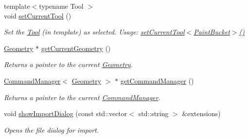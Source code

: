 \begin{DoxyCompactItemize}
{\footnotesize template$<$typename Tool $>$ }\\void \mbox{\hyperlink{classpepr3d_1_1_main_application_a429927346ea0766c39f0b713888f80fd}{set\+Current\+Tool}} ()
\begin{DoxyCompactList}\small\item\em Set the \mbox{\hyperlink{classpepr3d_1_1_tool}{Tool}} (in template) as selected. Usage\+: \mbox{\hyperlink{classpepr3d_1_1_main_application_a429927346ea0766c39f0b713888f80fd}{set\+Current\+Tool$<$\+Paint\+Bucket$>$()}} \end{DoxyCompactList}\item 
\mbox{\label{classpepr3d_1_1_main_application_ae47b18590297b63e6e0e5ae01fc027d5}} 
\mbox{\hyperlink{classpepr3d_1_1_geometry}{Geometry}} $\ast$ \mbox{\hyperlink{classpepr3d_1_1_main_application_ae47b18590297b63e6e0e5ae01fc027d5}{get\+Current\+Geometry}} ()
\begin{DoxyCompactList}\small\item\em Returns a pointer to the current \mbox{\hyperlink{classpepr3d_1_1_geometry}{Geometry}}. \end{DoxyCompactList}\item 
\mbox{\label{classpepr3d_1_1_main_application_a133b4db1b39af78dc68b5a9181eaabc7}} 
\mbox{\hyperlink{classpepr3d_1_1_command_manager}{Command\+Manager}}$<$ \mbox{\hyperlink{classpepr3d_1_1_geometry}{Geometry}} $>$ $\ast$ \mbox{\hyperlink{classpepr3d_1_1_main_application_a133b4db1b39af78dc68b5a9181eaabc7}{get\+Command\+Manager}} ()
\begin{DoxyCompactList}\small\item\em Returns a pointer to the current \mbox{\hyperlink{classpepr3d_1_1_command_manager}{Command\+Manager}}. \end{DoxyCompactList}\item 
\mbox{\label{classpepr3d_1_1_main_application_a7940de51f976d83f840e956be02481b3}} 
void \mbox{\hyperlink{classpepr3d_1_1_main_application_a7940de51f976d83f840e956be02481b3}{show\+Import\+Dialog}} (const std\+::vector$<$ std\+::string $>$ \&extensions)
\begin{DoxyCompactList}\small\item\em Opens the file dialog for import. \end{DoxyCompactList}\item 

\end{DoxyCompactItemize}
